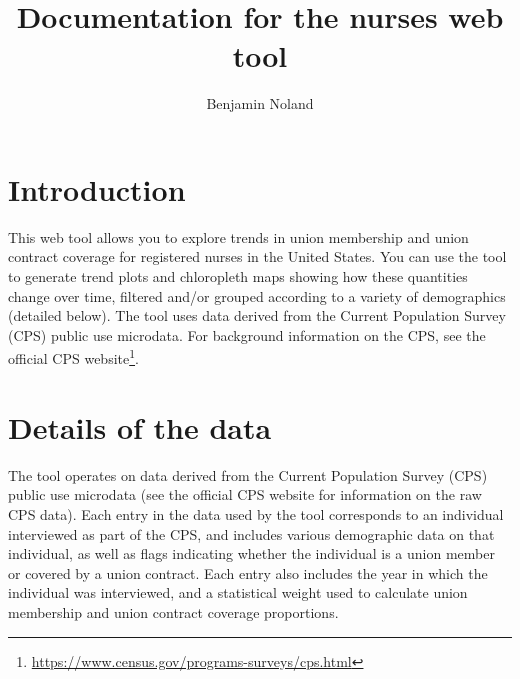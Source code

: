 \documentclass[letterpaper,12pt]{article}
\title{Documentation for the nurses web tool}
\author{Benjamin Noland}
\date{}
\begin{document}
\maketitle
\tableofcontents

\section{Introduction}

This web tool allows you to explore trends in union membership and
union contract coverage for registered nurses in the United
States. You can use the tool to generate trend plots and chloropleth
maps showing how these quantities change over time, filtered and/or
grouped according to a variety of demographics (detailed below). The
tool uses data derived from the Current Population Survey (CPS) public
use microdata. For background information on the CPS, see the official
CPS website\footnote{\url{https://www.census.gov/programs-surveys/cps.html}}.

\section{Details of the data}

The tool operates on data derived from the Current Population Survey
(CPS) public use microdata (see the official CPS website for
information on the raw CPS data).  Each entry in the data used by the
tool corresponds to an individual interviewed as part of the CPS, and
includes various demographic data on that individual, as well as flags
indicating whether the individual is a union member or covered by a
union contract. Each entry also includes the year in which the
individual was interviewed, and a statistical weight used to calculate
union membership and union contract coverage proportions.
\end{document}
